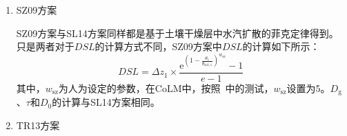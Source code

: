 \begin{enumerate}
  \item
    SZ09方案

    SZ09方案与SL14方案同样都是基于土壤干燥层中水汽扩散的菲克定律得到。只是两者对于\(DSL\)的计算方式不同，SZ09方案中\(DSL\)的计算如下所示：
    \begin{equation}
      DSL = \Delta z_{1} \times \frac{{\mathrm e}^{\left( 1 - \frac{\theta_{1}}{\theta_{\mathrm{sat,1}}} \right)^{w_{\mathrm{sz}}}} - 1}{e - 1}\
    \end{equation}
    其中，\(w_{\mathrm{sz}}\)为人为设定的参数，在CoLM中，按照~\citet{sz2009}中的测试，\(w_{\mathrm{sz}}\)设置为5。\(D_{\mathrm{g}}\)、\(\tau\)和\(D_{0}\)的计算与SL14方案相同。

  \item
    TR13方案


\end{enumerate}
